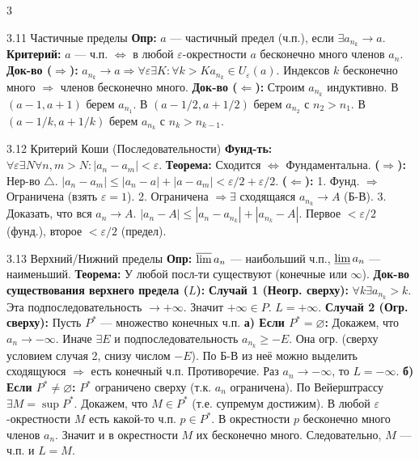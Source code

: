 \documentclass[8pt, a4paper, landscape]{extarticle}
\newcommand{\Ra}{\Rightarrow}
\newcommand{\eps}{\varepsilon}
\begin{document}
\begin{multicols*}{3}
\begin{ticket}{3.11 Частичные пределы}
\textbf{Опр:} $a$ — частичный предел (ч.п.), если $\exists a_{n_k} \to a$.
\textbf{Критерий:} $a$ — ч.п. $\iff$ в любой $\eps$-окрестности $a$ бесконечно много членов $a_n$.
\tcblower
\textbf{Док-во ($\Ra$):}
$a_{n_k} \to a \Ra \forall \eps \exists K: \forall k>K a_{n_k} \in U_\eps(a)$.
Индексов $k$ бесконечно много $\Ra$ членов бесконечно много.
\textbf{Док-во ($\Leftarrow$):}
Строим $a_{n_k}$ индуктивно.
В $(a-1, a+1)$ берем $a_{n_1}$.
В $(a-1/2, a+1/2)$ берем $a_{n_2}$ с $n_2 > n_1$.
В $(a-1/k, a+1/k)$ берем $a_{n_k}$ с $n_k > n_{k-1}$.
\end{ticket}

\begin{ticket}{3.12 Критерий Коши (Последовательности)}
\textbf{Фунд-ть:} $\forall \eps \exists N \forall n, m > N: |a_n - a_m| < \eps$.
\textbf{Теорема:} Сходится $\iff$ Фундаментальна.
\tcblower
\textbf{($\Ra$):} Нер-во $\triangle$. $|a_n - a_m| \le |a_n - a| + |a - a_m| < \eps/2 + \eps/2$.
\textbf{($\Leftarrow$):}
1. Фунд. $\Ra$ Ограничена (взять $\eps=1$).
2. Ограничена $\Ra \exists$ сходящаяся $a_{n_k} \to A$ (Б-В).
3. Доказать, что вся $a_n \to A$.
$|a_n - A| \le |a_n - a_{n_k}| + |a_{n_k} - A|$.
Первое $<\eps/2$ (фунд.), второе $<\eps/2$ (предел).
\end{ticket}

\begin{ticket}{3.13 Верхний/Нижний пределы}
\textbf{Опр:} $\varlimsup a_n$ — наибольший ч.п., $\varliminf a_n$ — наименьший.
\textbf{Теорема:} У любой посл-ти существуют (конечные или $\infty$).
\tcblower
\textbf{Док-во существования верхнего предела ($L$):}
\textbf{Случай 1 (Неогр. сверху):}
$\forall k \exists a_{n_k} > k$. Эта подпоследовательность $\to +\infty$.
Значит $+\infty \in P$. $L = +\infty$.
\textbf{Случай 2 (Огр. сверху):}
Пусть $P^*$ — множество конечных ч.п.
\textbf{а) Если $P^* = \varnothing$:}
Докажем, что $a_n \to -\infty$.
Иначе $\exists E$ и подпоследовательность $a_{n_k} \ge -E$.
Она огр. (сверху условием случая 2, снизу числом $-E$).
По Б-В из неё можно выделить сходящуюся $\Ra$ есть конечный ч.п. Противоречие.
Раз $a_n \to -\infty$, то $L = -\infty$.
\textbf{б) Если $P^* \ne \varnothing$:}
$P^*$ ограничено сверху (т.к. $a_n$ ограничена).
По Вейерштрассу $\exists M = \sup P^*$.
Докажем, что $M \in P^*$ (т.е. супремум достижим).
В любой $\eps$-окрестности $M$ есть какой-то ч.п. $p \in P^*$.
В окрестности $p$ бесконечно много членов $a_n$.
Значит и в окрестности $M$ их бесконечно много.
Следовательно, $M$ — ч.п. и $L = M$.


\end{ticket}
\end{multicols*}
\end{document}
